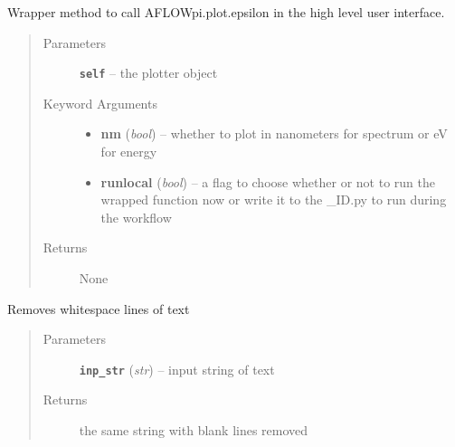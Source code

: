 \documentclass[letterpaper,10pt,english]{sphinxmanual}
\begin{document}
\begin{fulllineitems}

\begin{fulllineitems}
\label{prep:prep.plotter.transport}
Wrapper method to call AFLOWpi.plot.epsilon in the high level user interface.
\begin{quote}\begin{description}
\item[{Parameters}] \leavevmode
\textbf{\texttt{self}} -- the plotter object

\item[{Keyword Arguments}] \leavevmode\begin{itemize}
\item {} 
\textbf{nm} (\emph{bool}) --
whether to plot in nanometers for spectrum or eV for energy

\item {} 
\textbf{runlocal} (\emph{bool}) --
a flag to choose whether or not to run the wrapped function now
or write it to the \_ID.py to run during the workflow

\end{itemize}

\item[{Returns}] \leavevmode
None

\end{description}\end{quote}

\end{fulllineitems}


\end{fulllineitems}


\begin{fulllineitems}
\label{prep:prep.prep_split_step}
\end{fulllineitems}


\begin{fulllineitems}
\label{prep:prep.remove_blank_lines}
Removes whitespace lines of text
\begin{quote}\begin{description}
\item[{Parameters}] \leavevmode
\textbf{\texttt{inp\_str}} (\emph{str}) -- input string of text

\item[{Returns}] \leavevmode
the same string with blank lines removed

\end{description}\end{quote}

\end{fulllineitems}
\end{document}
